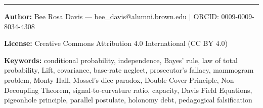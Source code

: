 \documentclass[12pt]{article}
\begin{document}
\vfill

\noindent\rule{\textwidth}{0.4pt}

{\small \noindent \textbf{Author:} Bee Rosa Davis --- bee\_davis@alumni.brown.edu $\mid$ ORCID: 0009-0009-8034-4308

\noindent \textbf{License:} Creative Commons Attribution 4.0 International (CC BY 4.0)

\noindent \textbf{Keywords:} conditional probability, independence, Bayes' rule, law of total probability, Lift, covariance, base-rate neglect, prosecutor's fallacy, mammogram problem, Monty Hall, Mossel's dice paradox, Double Cover Principle, Non-Decoupling Theorem, signal-to-curvature ratio, capacity, Davis Field Equations, pigeonhole principle, parallel postulate, holonomy debt, pedagogical falsification}
\end{document}
